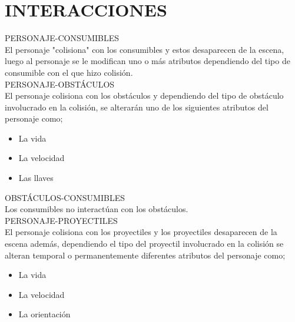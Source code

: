 \documentclass{article}
\begin{document}
\section{INTERACCIONES}
PERSONAJE-CONSUMIBLES\\
El personaje "colisiona" con los consumibles y estos
desaparecen de la escena, luego al personaje se le
modifican uno o más atributos dependiendo del tipo de
consumible con el que hizo colisión.\\
PERSONAJE-OBSTÁCULOS\\
El personaje colisiona con los obstáculos y dependiendo
del tipo de obstáculo involucrado en la colisión, se alterarán uno de los siguientes atributos del personaje como;
\begin{itemize}
    \item La vida
    \item La velocidad
    \item Las llaves
\end{itemize}
OBSTÁCULOS-CONSUMIBLES\\
Los consumibles no interactúan con los obstáculos.\\
PERSONAJE-PROYECTILES\\
El personaje colisiona con los proyectiles y los
proyectiles desaparecen de la escena además, dependiendo
el tipo del proyectil involucrado en la colisión se alteran temporal o
permanentemente diferentes atributos del personaje como;
\begin{itemize}
    \item La vida
    \item La velocidad
    \item La orientación
\end{itemize}
\end{document}
